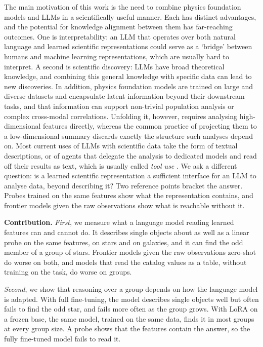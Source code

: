 The main motivation of this work is the need to combine physics foundation models and
LLMs in a scientifically useful manner. Each has distinct advantages, and the potential
for knowledge alignment between them has far-reaching outcomes. One is interpretability:
an LLM that operates over both natural language and learned scientific representations
could serve as a `bridge' between humans and machine learning representations, which are
usually hard to interpret. A second is scientific discovery: LLMs have broad theoretical knowledge, and combining this general knowledge with specific data can lead to new discoveries. In addition, physics foundation models are trained on
large and diverse datasets and encapsulate latent information beyond their downstream tasks,
and that information can support non-trivial population analysis or complex cross-modal
correlations. Unfolding it, however, requires analysing high-dimensional features
directly, whereas the common practice of projecting them to a low-dimensional summary
discards exactly the structure such analyses depend on. Most current uses of LLMs with
scientific data take the form of textual descriptions, or of agents that delegate the
analysis to dedicated models and read off their results as text, which is usually called
\emph{tool use} \citep{Schick2023_toolformer, Gao2023_pal, Hao2023ToolkenGPTAF}. We ask a
different question: is a learned scientific representation a sufficient interface for an LLM
to analyse data, beyond describing it? Two reference points bracket the answer. Probes trained
on the same features show what the representation contains, and frontier models given the raw
observations show what is reachable without it.

\textbf{Contribution.}
\emph{First}, we measure what a language model reading learned features can and cannot do. It
describes single objects about as well as a linear probe on the same features, on stars and on
galaxies, and it can find the odd member of a group of stars. Frontier models given the raw
observations zero-shot do worse on both, and models that read the catalog values as a table,
without training on the task, do worse on groups.

\emph{Second}, we show that reasoning over a group depends on how the language model is
adapted. With full fine-tuning, the model describes single objects well but often fails to
find the odd star, and fails more often as the group grows. With LoRA on a frozen base, the
same model, trained on the same data, finds it in most groups at every group size. A probe
shows that the features contain the answer, so the fully fine-tuned model fails to read it.


